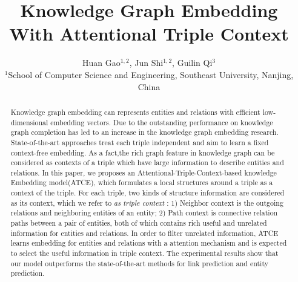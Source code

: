 \documentclass{article}
\title{Knowledge Graph Embedding With Attentional Triple Context}
\author{Huan Gao$^{1,2}$, Jun Shi$^{1,2}$, Guilin Qi$^{3}$\\
$^{1}$School of Computer Science and Engineering,
Southeast University, Nanjing, China  \\
}
\begin{document}
\maketitle

\begin{abstract}
    Knowledge graph embedding can represents entities and relations with efficient low-dimensional embedding vectors. Due to the outstanding performance on knowledge graph completion has led to an increase in the knowledge graph embedding research. State-of-the-art approaches treat each triple independent and aim to learn a fixed context-free embedding. As a fact,the rich graph feature in knowledge graph can be considered as contexts of a triple which have large information to describe entities and relations. In this paper, we proposes an Attentional-Triple-Context-based knowledge Embedding model(ATCE), which formulates a local structures around a triple as a context of the triple. For each triple, two kinds of structure information are considered as its context, which we refer to \emph{as triple context} : 1) Neighbor context is the outgoing relations and neighboring entities of an entity; 2) Path context is connective relation paths between a pair of entities, both of which contains rich useful and unrelated information for entities and relations. In order to filter unrelated information, ATCE learns embedding for entities and relations with a attention mechanism and is expected to select the useful information in triple context. The experimental results show that our model outperforms the state-of-the-art methods for link prediction and entity prediction.
\end{abstract}












%

\end{document}
